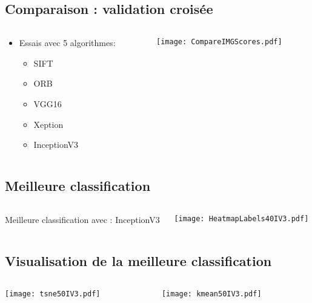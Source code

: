 \documentclass[8pt,aspectratio=169,hyperref={unicode=true}]{beamer}
\begin{document}
\subsection{Comparaison : validation croisée}
\begin{frame}{\insertsubsection}
    \begin{columns}
        \begin{column}{.4\textwidth}
            \begin{itemize}
                \item Essais avec 5 algorithmes:
                      \begin{itemize}
                          \item SIFT
                          \item ORB
                          \item VGG16
                          \item Xeption
                          \item InceptionV3
                      \end{itemize}
            \end{itemize}
        \end{column}
        \begin{column}{.6\textwidth}
            \texttt{[image: CompareIMGScores.pdf]}
        \end{column}
    \end{columns}
\end{frame}

\subsection{Meilleure classification}
\begin{frame}{\insertsubsection}
    \begin{columns}
        \begin{column}{.5\textwidth}
            Meilleure classification avec : InceptionV3
        \end{column}
        \begin{column}{.5\textwidth}
            \texttt{[image: HeatmapLabels40IV3.pdf]}
        \end{column}
    \end{columns}
\end{frame}

\subsection{Visualisation de la meilleure classification}
\begin{frame}{\insertsubsection}
\begin{columns}
    \begin{column}{.5\textwidth}
        \texttt{[image: tsne50IV3.pdf]}
    \end{column}
    \begin{column}{.5\textwidth}
        \texttt{[image: kmean50IV3.pdf]}
    \end{column}
\end{columns}
\end{frame}
\end{document}
